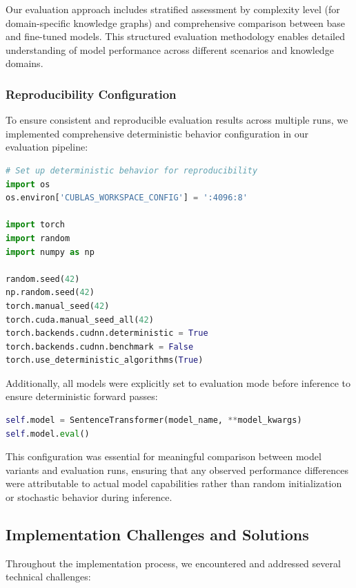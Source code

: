 Our evaluation approach includes stratified assessment by complexity level (for domain-specific knowledge graphs) and comprehensive comparison between base and fine-tuned models. This structured evaluation methodology enables detailed understanding of model performance across different scenarios and knowledge domains.

\subsubsection{Reproducibility Configuration}
To ensure consistent and reproducible evaluation results across multiple runs, we implemented comprehensive deterministic behavior configuration in our evaluation pipeline:

\begin{lstlisting}[breaklines=true,language=python, caption=Deterministic Configuration for Reproducibility, label=code:deterministic-config]
# Set up deterministic behavior for reproducibility
import os
os.environ['CUBLAS_WORKSPACE_CONFIG'] = ':4096:8'

import torch
import random
import numpy as np

random.seed(42)
np.random.seed(42)
torch.manual_seed(42)
torch.cuda.manual_seed_all(42)
torch.backends.cudnn.deterministic = True
torch.backends.cudnn.benchmark = False
torch.use_deterministic_algorithms(True)
\end{lstlisting}

Additionally, all models were explicitly set to evaluation mode before inference to ensure deterministic forward passes:

\begin{lstlisting}[breaklines=true,language=python, caption=Model Evaluation Mode Setting, label=code:model-eval-mode]
self.model = SentenceTransformer(model_name, **model_kwargs)
self.model.eval()
\end{lstlisting}

This configuration was essential for meaningful comparison between model variants and evaluation runs, ensuring that any observed performance differences were attributable to actual model capabilities rather than random initialization or stochastic behavior during inference.

\subsection{Implementation Challenges and Solutions}

Throughout the implementation process, we encountered and addressed several technical challenges:

